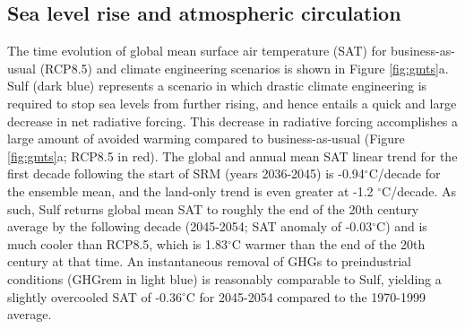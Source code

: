 \documentclass[draft,grl]{AGUTeX}  %
\begin{document}
\begin{article}

\section{Sea level rise and atmospheric circulation}

The time evolution of global mean surface air temperature (SAT) for business-as-usual (RCP8.5) and climate engineering scenarios is shown in Figure \ref{fig:gmts}a. Sulf (dark blue) represents a scenario in which drastic climate engineering is required to stop sea levels from further rising, and hence entails a quick and large decrease in net radiative forcing. This decrease in radiative forcing accomplishes a large amount of avoided warming compared to business-as-usual (Figure \ref{fig:gmts}a; RCP8.5 in red). The global and annual mean SAT linear trend for the first decade following the start of SRM (years 2036-2045) is -0.94$^\circ$C/decade for the ensemble mean, and the land-only trend is even greater at -1.2 $^\circ$C/decade. As such, Sulf returns global mean SAT to roughly the end of the 20th century average by the following decade (2045-2054; SAT anomaly of -0.03$^\circ$C) and is much cooler than RCP8.5, which is 1.83$^\circ$C warmer than the end of the 20th century at that time. An instantaneous removal of GHGs to preindustrial conditions (GHGrem in light blue) is reasonably comparable to Sulf, yielding a slightly overcooled SAT of -0.36$^\circ$C for 2045-2054 compared to the 1970-1999 average. %


\end{article}
\end{document}

